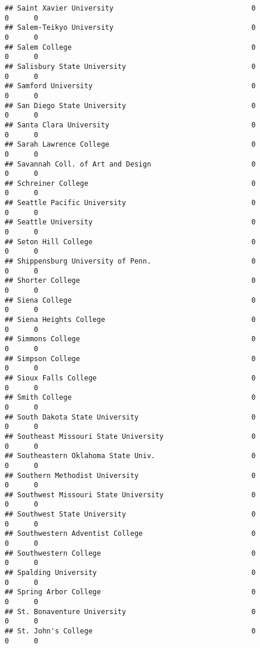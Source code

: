 \documentclass[
]{article}
\begin{document}
\begin{verbatim}
## Saint Xavier University                                 0          0      0
## Salem-Teikyo University                                 0          0      0
## Salem College                                           0          0      0
## Salisbury State University                              0          0      0
## Samford University                                      0          0      0
## San Diego State University                              0          0      0
## Santa Clara University                                  0          0      0
## Sarah Lawrence College                                  0          0      0
## Savannah Coll. of Art and Design                        0          0      0
## Schreiner College                                       0          0      0
## Seattle Pacific University                              0          0      0
## Seattle University                                      0          0      0
## Seton Hill College                                      0          0      0
## Shippensburg University of Penn.                        0          0      0
## Shorter College                                         0          0      0
## Siena College                                           0          0      0
## Siena Heights College                                   0          0      0
## Simmons College                                         0          0      0
## Simpson College                                         0          0      0
## Sioux Falls College                                     0          0      0
## Smith College                                           0          0      0
## South Dakota State University                           0          0      0
## Southeast Missouri State University                     0          0      0
## Southeastern Oklahoma State Univ.                       0          0      0
## Southern Methodist University                           0          0      0
## Southwest Missouri State University                     0          0      0
## Southwest State University                              0          0      0
## Southwestern Adventist College                          0          0      0
## Southwestern College                                    0          0      0
## Spalding University                                     0          0      0
## Spring Arbor College                                    0          0      0
## St. Bonaventure University                              0          0      0
## St. John's College                                      0          0      0

\end{verbatim}
\end{document}
